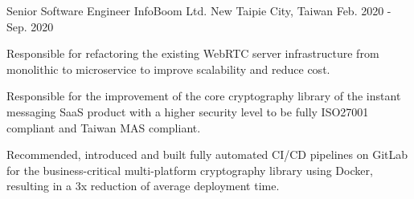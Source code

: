 \begin{cventries}
{\begin{cvitems}
        \end{cvitems}
    }

    \cventry
    {Senior Software Engineer} %
    {InfoBoom Ltd.} %
    {New Taipie City, Taiwan} %
    {Feb. 2020 - Sep. 2020} %
    {
        \begin{cvitems} %
        \item {Responsible for refactoring the existing WebRTC server infrastructure from monolithic to microservice to improve scalability and reduce cost.}
        \item {Responsible for the improvement of the core cryptography library of the instant messaging SaaS product with a higher security level to be fully ISO27001 compliant and Taiwan MAS compliant.}
        \item {Recommended, introduced and built fully automated CI/CD pipelines on GitLab for the business-critical multi-platform cryptography library using Docker, resulting in a 3x reduction of average deployment time.}
        \end{cvitems}
    }


\end{cventries}
